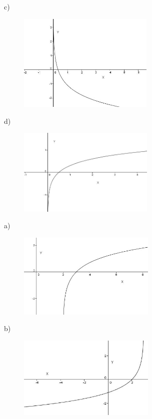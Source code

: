 \begin{respostas}{7}
c)
\begin{figure}[H]
	\begin{Center}
		\includegraphics[width=2.55in,height=1.84in]{capitulos/logaritmos_e_funcao_logaritmica/media/image28.JPG}
	\end{Center}
\end{figure}

d)
\begin{figure}[H]
	\begin{Center}
		\includegraphics[width=2.56in,height=1.64in]{capitulos/logaritmos_e_funcao_logaritmica/media/image29.JPG}
	\end{Center}
\end{figure}

    \ansitem{}

a)\begin{figure}[H]
	\begin{Center}
		\includegraphics[width=2.58in,height=1.6in]{capitulos/logaritmos_e_funcao_logaritmica/media/image30.JPG}
	\end{Center}
\end{figure}

b)\begin{figure}[H]
	\begin{Center}
		\includegraphics[width=2.58in,height=1.55in]{capitulos/logaritmos_e_funcao_logaritmica/media/image31.JPG}
	\end{Center}
\end{figure}


\end{respostas}
